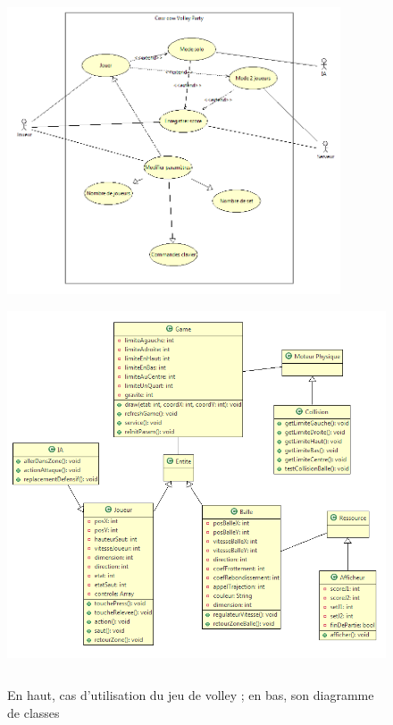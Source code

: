 \begin{figure}[h]
 \centering
 \includegraphics[height=8.5cm]{../umls/UML_images/Volley/utilisation} \hfill
 \includegraphics[height=11cm]{../umls/UML_images/Volley/class} \hfill
 \caption{En haut, cas d'utilisation du jeu de volley ; en bas, son diagramme de classes}
\end{figure}

